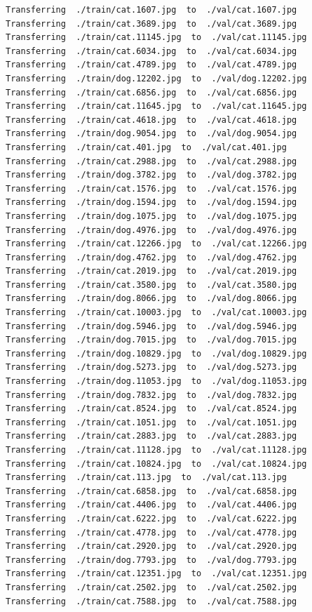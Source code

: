 \documentclass[]{book}
\theoremstyle{definition}
\theoremstyle{definition}
\theoremstyle{definition}
\theoremstyle{remark}
\begin{document}
\begin{verbatim}
Transferring  ./train/cat.1607.jpg  to  ./val/cat.1607.jpg
Transferring  ./train/cat.3689.jpg  to  ./val/cat.3689.jpg
Transferring  ./train/cat.11145.jpg  to  ./val/cat.11145.jpg
Transferring  ./train/cat.6034.jpg  to  ./val/cat.6034.jpg
Transferring  ./train/cat.4789.jpg  to  ./val/cat.4789.jpg
Transferring  ./train/dog.12202.jpg  to  ./val/dog.12202.jpg
Transferring  ./train/cat.6856.jpg  to  ./val/cat.6856.jpg
Transferring  ./train/cat.11645.jpg  to  ./val/cat.11645.jpg
Transferring  ./train/cat.4618.jpg  to  ./val/cat.4618.jpg
Transferring  ./train/dog.9054.jpg  to  ./val/dog.9054.jpg
Transferring  ./train/cat.401.jpg  to  ./val/cat.401.jpg
Transferring  ./train/cat.2988.jpg  to  ./val/cat.2988.jpg
Transferring  ./train/dog.3782.jpg  to  ./val/dog.3782.jpg
Transferring  ./train/cat.1576.jpg  to  ./val/cat.1576.jpg
Transferring  ./train/dog.1594.jpg  to  ./val/dog.1594.jpg
Transferring  ./train/dog.1075.jpg  to  ./val/dog.1075.jpg
Transferring  ./train/dog.4976.jpg  to  ./val/dog.4976.jpg
Transferring  ./train/cat.12266.jpg  to  ./val/cat.12266.jpg
Transferring  ./train/dog.4762.jpg  to  ./val/dog.4762.jpg
Transferring  ./train/cat.2019.jpg  to  ./val/cat.2019.jpg
Transferring  ./train/cat.3580.jpg  to  ./val/cat.3580.jpg
Transferring  ./train/dog.8066.jpg  to  ./val/dog.8066.jpg
Transferring  ./train/cat.10003.jpg  to  ./val/cat.10003.jpg
Transferring  ./train/dog.5946.jpg  to  ./val/dog.5946.jpg
Transferring  ./train/dog.7015.jpg  to  ./val/dog.7015.jpg
Transferring  ./train/dog.10829.jpg  to  ./val/dog.10829.jpg
Transferring  ./train/dog.5273.jpg  to  ./val/dog.5273.jpg
Transferring  ./train/dog.11053.jpg  to  ./val/dog.11053.jpg
Transferring  ./train/dog.7832.jpg  to  ./val/dog.7832.jpg
Transferring  ./train/cat.8524.jpg  to  ./val/cat.8524.jpg
Transferring  ./train/cat.1051.jpg  to  ./val/cat.1051.jpg
Transferring  ./train/cat.2883.jpg  to  ./val/cat.2883.jpg
Transferring  ./train/cat.11128.jpg  to  ./val/cat.11128.jpg
Transferring  ./train/cat.10824.jpg  to  ./val/cat.10824.jpg
Transferring  ./train/cat.113.jpg  to  ./val/cat.113.jpg
Transferring  ./train/cat.6858.jpg  to  ./val/cat.6858.jpg
Transferring  ./train/cat.4406.jpg  to  ./val/cat.4406.jpg
Transferring  ./train/cat.6222.jpg  to  ./val/cat.6222.jpg
Transferring  ./train/cat.4778.jpg  to  ./val/cat.4778.jpg
Transferring  ./train/cat.2920.jpg  to  ./val/cat.2920.jpg
Transferring  ./train/dog.7793.jpg  to  ./val/dog.7793.jpg
Transferring  ./train/cat.12351.jpg  to  ./val/cat.12351.jpg
Transferring  ./train/cat.2502.jpg  to  ./val/cat.2502.jpg
Transferring  ./train/cat.7588.jpg  to  ./val/cat.7588.jpg

\end{verbatim}
\end{document}
